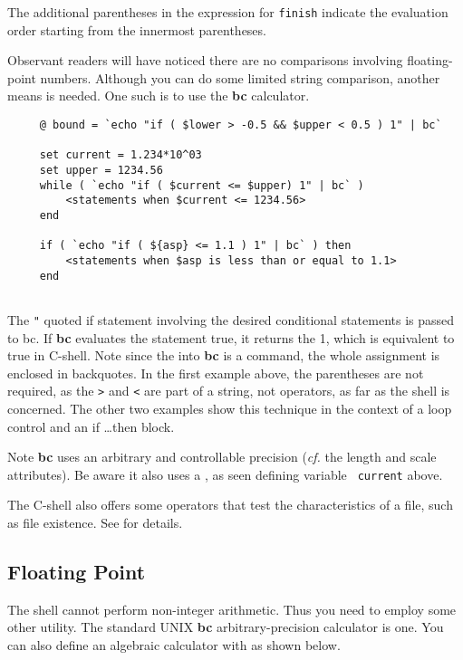 The additional parentheses in the expression for {\tt finish} indicate
the evaluation order starting from the innermost parentheses.

Observant readers will have noticed there are no comparisons involving
floating-point numbers.  Although you can do some limited string comparison,
another means is needed.  One such is to use the {\bf bc} calculator.

\small
\begin{verbatim}
     @ bound = `echo "if ( $lower > -0.5 && $upper < 0.5 ) 1" | bc`

     set current = 1.234*10^03
     set upper = 1234.56
     while ( `echo "if ( $current <= $upper) 1" | bc` )
         <statements when $current <= 1234.56>
     end

     if ( `echo "if ( ${asp} <= 1.1 ) 1" | bc` ) then
         <statements when $asp is less than or equal to 1.1>
     end
     
\end{verbatim}
\normalsize

The {\tt{"}} quoted if statement involving the desired conditional
statements is passed to bc.  If {\bf bc} evaluates the statement true,
it returns the 1, which is equivalent to true in C-shell.  Note since
the  into {\bf bc} is a command,
the whole assignment is enclosed in backquotes.  In the first example
above, the parentheses are not required, as the {\tt >} and {\tt <}
are part of a string, not operators, as far as the shell is concerned.
The other two examples show this technique in the context of a loop
control and an if \ldots then block.

Note {\bf bc} uses an arbitrary and controllable precision (\emph{cf.}
the length and scale attributes).  Be aware it also uses a 
, as seen defining variable {\tt
current} above.

The C-shell also offers some operators that test the characteristics
of a file, such as file existence.  See
 for details.

\newpage
\subsection{Floating Point\label{sc4_se_real}}

The shell cannot perform non-integer arithmetic.  Thus you need to
employ some other utility.  The standard UNIX {\bf bc}
arbitrary-precision calculator is one.  You can also define
an algebraic calculator with  as shown
below.

